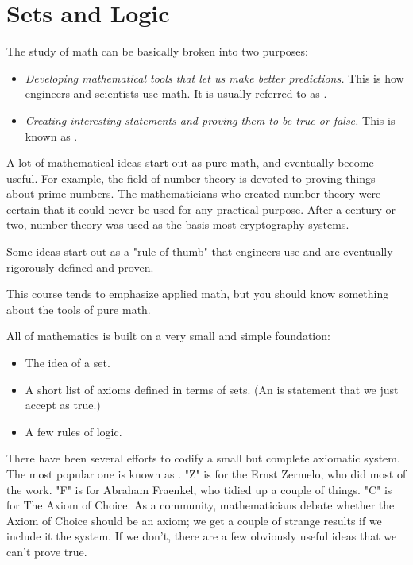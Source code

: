 \chapter{Sets and Logic}

The study of math can be basically broken into two purposes:
\begin{itemize}
\item \textit{Developing mathematical tools that let us make better predictions.}  This is how engineers and scientists use math.  It is usually referred to as .
\item \textit{Creating interesting statements and proving them to be true or false.}  This is known as .
\end{itemize}

A lot of mathematical ideas start out as pure math, and eventually
become useful.  For example, the field of number theory is devoted to
proving things about prime numbers.  The mathematicians who created
number theory were certain that it could never be used for any
practical purpose.  After a century or two, number theory was used as
the basis most cryptography systems.

Some ideas start out as a "rule of thumb" that engineers use and are
eventually rigorously defined and proven.

This course tends to emphasize applied math, but you should know
something about the tools of pure math.

All of mathematics is built on a very small and simple foundation:
\begin{itemize}
\item The idea of a set.
\item A short list of axioms defined in terms of sets. (An  is statement that we just accept as true.)
\item A few rules of logic.
\end{itemize}

There have been several efforts to codify a small but complete
axiomatic system. The most popular one is known as .  "Z"
is for the Ernst Zermelo, who did most of the work.  "F" is for
Abraham Fraenkel, who tidied up a couple of things. "C" is for The
Axiom of Choice.  As a community, mathematicians debate whether the
Axiom of Choice should be an axiom; we get a couple of strange results
if we include it the system.  If we don't, there are a few obviously
useful ideas that we can't prove true.

